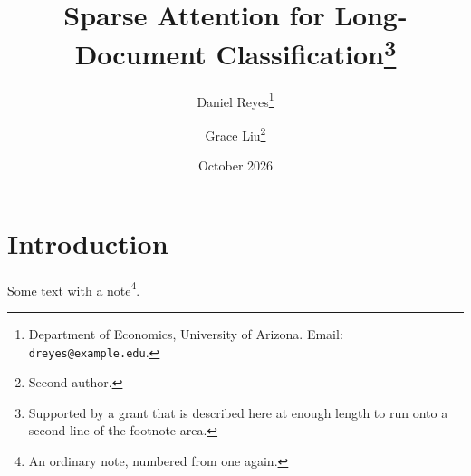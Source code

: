 \documentclass{article}
\title{Sparse Attention for Long-Document Classification\thanks{Supported by a grant that is described here at enough length to run onto a second line of the footnote area.}}
\author{Daniel Reyes\thanks{Department of Economics, University of Arizona. Email:
\texttt{dreyes@example.edu}.} \and Grace Liu\footnote{Second author.}}
\date{October 2026}
\begin{document}
\maketitle
\section{Introduction}
Some text with a note\footnote{An ordinary note, numbered from one again.}.
\end{document}
